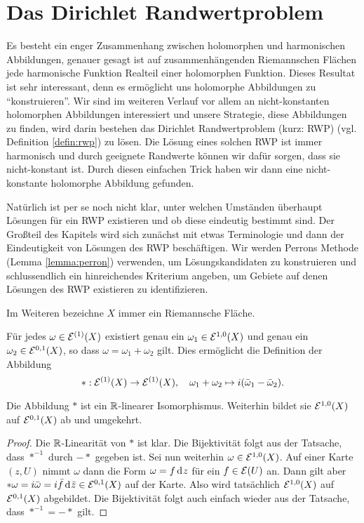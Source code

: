 
\section{Das Dirichlet Randwertproblem}
\label{sec:Dirichlet}

Es besteht ein enger Zusammenhang zwischen holomorphen und
harmonischen Abbildungen, genauer gesagt ist auf
zusammenhängenden Riemannschen Flächen jede harmonische Funktion
Realteil einer holomorphen Funktion. Dieses Resultat ist sehr
interessant, denn es ermöglicht uns holomorphe Abbildungen zu
"`konstruieren"'. Wir sind im weiteren Verlauf vor allem an
nicht-konstanten holomorphen Abbildungen interessiert und unsere
Strategie, diese Abbildungen zu finden, wird darin bestehen das
Dirichlet Randwertproblem (kurz: RWP) (vgl. Definition
\ref{defin:rwp}) zu lösen. Die Lösung eines solchen RWP ist immer
harmonisch und durch geeignete Randwerte können wir dafür sorgen, dass
sie nicht-konstant ist. Durch diesen einfachen Trick haben wir dann
eine nicht-konstante holomorphe Abbildung gefunden.

Natürlich ist per se noch nicht klar, unter welchen Umständen
überhaupt Lösungen für ein RWP existieren und ob diese eindeutig
bestimmt sind. Der Großteil des Kapitels wird sich zunächst mit etwas
Terminologie und dann der Eindeutigkeit von Lösungen des RWP
beschäftigen. Wir werden Perrons Methode (Lemma \ref{lemma:perron})
verwenden, um Lösungskandidaten zu konstruieren und schlussendlich ein
hinreichendes Kriterium angeben, um Gebiete auf denen Lösungen des RWP
existieren zu identifizieren.

Im Weiteren bezeichne $X$ immer ein Riemannsche Fläche.

\begin{defin}
  Für jedes $\omega \in \mathcal{E}^{(1)}(X)$ existiert genau ein $\omega_1
  \in \mathcal{E}^{1,0}(X)$ und genau ein $\omega_2 \in \mathcal{E}^{0,1}(X)$, so
  dass $\omega = \omega_1 + \omega_2$ gilt. Dies ermöglicht die
  Definition der Abbildung
  \[
  \ast : \mathcal{E}^{(1)}(X) \rightarrow \mathcal{E}^{(1)}(X), \quad \omega_1 + \omega_2
  \mapsto i(\bar \omega_1 - \bar \omega_2).
  \]
\end{defin}

\begin{prop}
  Die Abbildung $\ast$ ist ein $\mathbb{R}$-linearer Isomorphismus. Weiterhin
  bildet sie  $\mathcal{E}^{1,0}(X)$ auf $\mathcal{E}^{0,1}(X)$ ab und umgekehrt.
\end{prop}

\begin{proof}
  Die $\mathbb{R}$-Linearität von $\ast$ ist klar. Die Bijektivität folgt aus
  der Tatsache, dass $\ast^{-1}$ durch $- \ast$ gegeben ist. Sei nun weiterhin
  $\omega \in \mathcal{E}^{1,0}(X)$. Auf einer Karte $(z,U)$ nimmt $\omega$
  dann die Form $\omega = f \d[z]$ für ein $f \in \mathcal{E}(U)$ an. Dann gilt
  aber $\ast \omega = i \bar \omega = i \bar f \d[\bar z] \in
  \diff^{0,1}(X)$ auf der Karte. Also wird tatsächlich
  $\mathcal{E}^{1,0}(X)$ auf $\mathcal{E}^{0,1}(X)$ abgebildet. Die Bijektivität
  folgt auch einfach wieder aus der Tatsache, dass $\ast^{-1} = -
  \ast$ gilt.
\end{proof}

